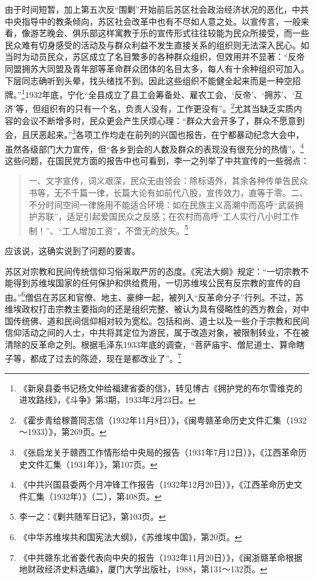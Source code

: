 由于时间短暂，加上第五次反“围剿”开始前后苏区社会政治经济状况的恶化，中共中央指导中的教条倾向，苏区社会改革中也有不尽如人意之处。以宣传言，一般来看，像游艺晚会、俱乐部这样寓教于乐的宣传形式往往较能为民众所接受，而一些民众难有切身感受的活动及与群众利益不发生直接关系的组织则无法深入民心。如当时为动员民众，苏区成立了名目繁多的各种群众组织，但效用并不显著：“反帝同盟拥苏大同盟及青年部等革命群众团体的名目太多，每人有十余种组织可加入。下层同志确听到头晕，找头绪找不到。因此这些组织不能健全起来而是一种空招牌。”\footnote{《新泉县委书记杨文仲给福建省委的信》，转见博古《拥护党的布尔雪维克的进攻路线》，《斗争》第3期，1933年2月23日。}1932年底，宁化“全县成立了县工会筹备处、雇农工会、‘反帝’、‘拥苏’、‘互济’等，但组织有的只有一个名，负责人没有，工作更没有”。\footnote{《霍步青给稼蔷同志信（1932年11月8日）》，《闽粤赣革命历史文件汇集（1932～1933）》，第269页。}尤其当缺乏实质内容的会议不断增多时，民众更会产生厌烦心理：“群众大会开多了，群众不愿意到会，且厌恶起来。”\footnote{《张启龙关于赣西工作情形给中央局的报告（1931年7月12日）》，《江西革命历史文件汇集（1931年）》，第107页。}各项工作均走在前列的兴国也报告，在宁都暴动纪念大会中，虽然各级部门大力宣传，但“各乡到会的人数及群众的表现没有很充分的热情”。\footnote{《中共兴国县委两个月冲锋工作报告（1932年12月20日）》，《江西革命历史文件汇集（1932年）》（二），第408页。}这些问题，在国民党方面的报告中也可看到，李一之列举了中共宣传的一些弱点：

\begin{quote}

一、文字宣传，词义艰深，民众无由领会：除标语外，其余各种传单告民众书等，无不千篇一律，长篇大论有如前代八股，宣传效力，直等于零。二、不分时间空间一律施用不能适合环境：如在民族主义高潮中而高呼“武装拥护苏联”，适足引起爱国民众之反感；在农村而高呼“工人实行八小时工作制！”、“工人增加工资”，不啻无的放矢。\footnote{李一之：《剿共随军日记》，第103页。}
\end{quote}


应该说，这确实说到了问题的要害。


苏区对宗教和民间传统信仰习俗采取严厉的态度。《宪法大纲》规定：“一切宗教不能得到苏维埃国家的任何保护和供给费用，一切苏维埃公民有反宗教的宣传的自由。”\footnote{《中华苏维埃共和国宪法大纲》，《苏维埃中国》，第20页。}僧侣在苏区和官僚、地主、豪绅一起，被列入“反革命分子”行列。不过，苏维埃政权打击宗教主要指向的还是组织完整、被认为具有侵略性的西方教会，对中国传统佛、道和民间信仰相对较为宽松。包括和尚、道士以及一些介于宗教和民间信仰活动之间的人士，中共将其定位为游民，属于改造对象，被限制转业，不在被清除的反革命之列。根据毛泽东1933年底的调查，“菩萨庙宇、僧尼道士、算命瞎子等，都成了过去的陈迹，现在是都改业了”。\footnote{《中共赣东北省委代表向中央的报告（1932年11月20日）》，《闽浙赣革命根据地财政经济史料选编》，厦门大学出版社，1988，第131～132页。}



